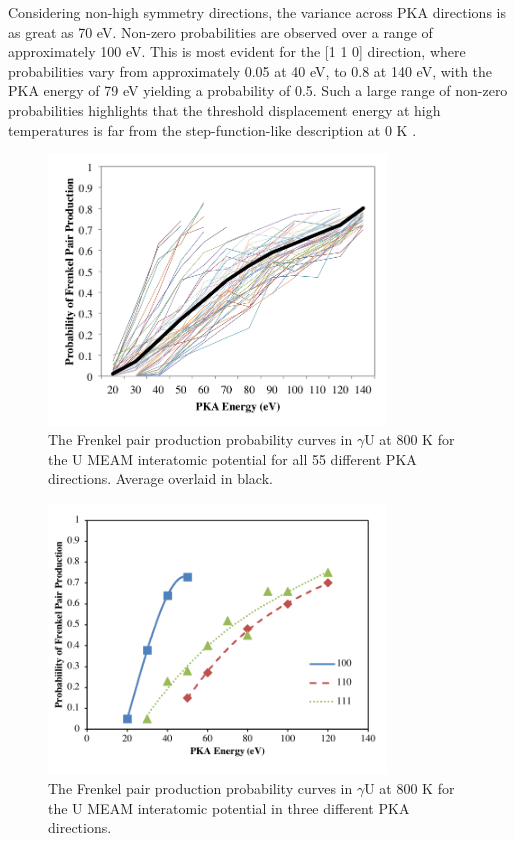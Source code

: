 \documentclass[review]{elsarticle}
\begin{document}
Considering non-high symmetry directions, the variance across PKA directions is as great as 70 eV. Non-zero probabilities are observed over a range of approximately 100 eV. This is most evident for the [1 1 0] direction, where probabilities vary from approximately 0.05 at 40 eV, to 0.8 at 140 eV, with the PKA energy of 79 eV yielding a probability of 0.5. Such a large range of non-zero probabilities highlights that the threshold displacement energy at high temperatures is far from the step-function-like description at 0 K \cite{was2007}.
 
 \begin{figure}[h]
 \centering
 \includegraphics[width=0.8\textwidth]{ed_dir_allC.png} 
 \caption{The Frenkel pair production probability curves in $\gamma$U at 800 K for the U MEAM interatomic potential for all 55 different PKA directions. Average overlaid in black.}
 \label{fig:ed_dirall}
\end{figure}
 
\begin{figure}[h]
 \centering
 \includegraphics[width=0.8\textwidth]{ed_dirBrev.png} 
 \caption{The Frenkel pair production probability curves in $\gamma$U at 800 K for the U MEAM interatomic potential in three different PKA directions.}
 \label{fig:ed_dir}
\end{figure}
\end{document}
